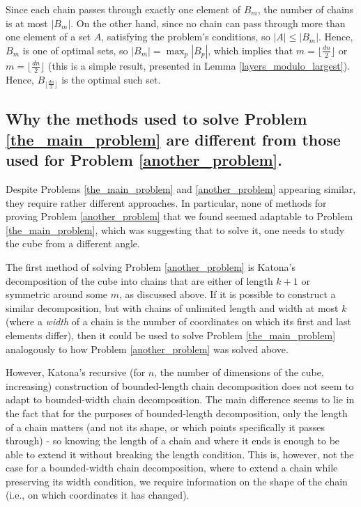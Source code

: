 \documentclass[11pt, reqno]{amsart}
\numberwithin{equation}{section}
\begin{document}
Since each chain passes through exactly one element of $B_m$, the number of chains is at most $|B_m|$.
On the other hand, since no chain can pass through more than one element of a set $A$, satisfying the problem's conditions, so $|A| \leqslant |B_m|$. Hence, $B_m$ is one of optimal sets, so $|B_m|=\max_p |B_p|$, which implies that $m=\lfloor \frac{dn}{2} \rfloor$ or $m=\lfloor \frac{dn}{2} \rfloor$ (this is a simple result, presented in Lemma \ref{layers_modulo_largest}). Hence, $B_{\lfloor \frac{dn}{2} \rfloor}$ is the optimal such set.

\subsection{Why the methods used to solve Problem \ref{the_main_problem} are different from those used for Problem \ref{another_problem}.}

Despite Problems \ref{the_main_problem} and \ref{another_problem} appearing similar, they require rather different approaches. In particular, none of methods for proving Problem \ref{another_problem} that we found seemed adaptable to Problem \ref{the_main_problem}, which was suggesting that to solve it, one needs to study the cube from a different angle.

The first method of solving Problem \ref{another_problem} is Katona's decomposition of the cube into chains that are either of length $k+1$ or symmetric around some $m$, as discussed above. If it is possible to construct a similar decomposition, but with chains of unlimited length and width at most $k$ (where a \emph{width} of a chain is the number of coordinates on which its first and last elements differ), then it could be used to solve Problem \ref{the_main_problem} analogously to how Problem \ref{another_problem} was solved above.

However, Katona's recursive (for $n$, the number of dimensions of the cube, increasing) construction of bounded-length chain decomposition does not seem to adapt to bounded-width chain decomposition. The main difference seems to lie in the fact that for the purposes of bounded-length decomposition, only the length of a chain matters (and not its shape, or which points specifically it passes through) - so knowing the length of a chain and where it ends is enough to be able to extend it without breaking the length condition. This is, however, not the case for a bounded-width chain decomposition, where to extend a chain while preserving its width condition, we require information on the shape of the chain (i.e., on which coordinates it has changed).
\end{document}
